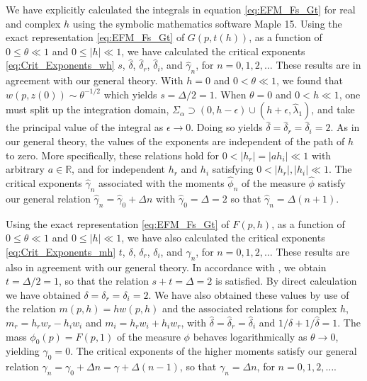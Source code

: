 \documentclass[english,12pt,jmp,graphicx]{revtex4-1}
\newcommand{\ph}{\hat{\phi}}
\newcommand{\gh}{\hat{\gamma}}
\newcommand{\dha}{\hat{\delta}}
\begin{document}
We have explicitly calculated the integrals in equation 
\eqref{eq:EFM_Fs_Gt} for real and complex $h$ using the symbolic
mathematics software Maple 15. Using the exact representation
\eqref{eq:EFM_Fs_Gt} of $G(p,t(h))$, as a function of $0\leq\theta\ll1$ and
$0\leq|h|\ll1$, we have calculated the critical exponents
\eqref{eq:Crit_Exponents_wh} $s$, $\dha$, $\dha_r$, $\dha_i$, and
$\gh_n$, for $n=0,1,2,\ldots$ These results are in agreement with our
general theory. With $h=0$ and $0<\theta\ll1$, we found that
$w(p,z(0))\sim\theta^{-1/2}$ which yields $s=\Delta/2=1$. When $\theta=0$ and $0<h\ll1$, one 
must split up the integration domain, $\Sigma_\alpha\supset(0,h-\epsilon)\cup(h+\epsilon,\hat{\lambda}_1)$, and
take the principal value of the integral as $\epsilon\to0$. Doing so yields
$\dha=\dha_r=\dha_i=2$. As in our general theory, the values of the
exponents are independent of the path of $h$ to zero. More
specifically, these relations hold for $0<|h_r|=|ah_i|\ll1$ with
arbitrary $a\in\mathbb{R}$, and for independent $h_r$ and $h_i$
satisfying $0<|h_r|,|h_i|\ll1$. The critical exponents $\gh_n$
associated with the moments $\ph_n$ of the measure $\ph$ satisfy our
general relation $\gh_n=\gh_0+\Delta n$ with $\gh_0=\Delta=2$ so that
$\gh_n=\Delta(n+1)$.%

Using the exact representation \eqref{eq:EFM_Fs_Gt} of $F(p,h)$, as a
function of $0\leq\theta\ll1$ and $0\leq|h|\ll1$, we have also calculated the
critical exponents \eqref{eq:Crit_Exponents_mh} $t$, $\delta$, $\delta_r$,
$\delta_i$, and $\gamma_n$, for $n=0,1,2,\ldots$ These results are also in agreement
with our general theory. In accordance with \cite{Day:JPCM-96}, we
obtain $t=\Delta/2=1$, so that the relation $s+t=\Delta=2$ is
satisfied. By direct calculation we have obtained $\delta=\delta_r=\delta_i=2$. We
have also obtained these values by use of the relation 
$m(p,h)=hw(p,h)$ and the associated relations for complex $h$,
$m_r=h_rw_r-h_iw_i$ and $m_i=h_rw_i+h_iw_r$, with $\dha=\dha_r=\dha_i$
and $1/\delta+1/\dha=1$.
The mass $\phi_0(p)=F(p,1)$ of the measure $\phi$ behaves
logarithmically as $\theta\to0$, yielding $\gamma_0=0$. The critical exponents of
the higher moments satisfy our general relation
$\gamma_n=\gamma_0+\Delta n=\gamma+\Delta(n-1)$, so that $\gamma_n=\Delta n$, for $n=0,1,2,\ldots$.
\end{document}
